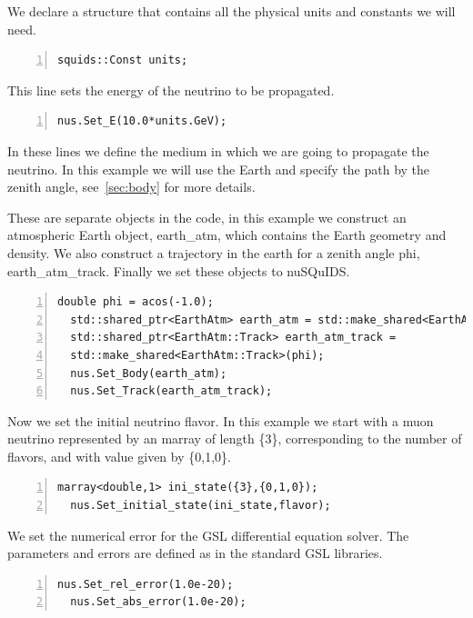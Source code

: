 \documentclass[3p,12pt]{elsarticle}
\newcommand{\ttf}{\ttfamily}
\begin{document}
We declare a structure that contains all the physical units and
constants we will need. 
\begin{lstlisting}[frame=leftline, numbers = left,breaklines=true, label = ex:sin1,firstnumber=last]
  squids::Const units;
\end{lstlisting}

This line sets the energy of the neutrino to be propagated.
\begin{lstlisting}[frame=leftline, numbers = left,breaklines=true, label = ex:sin1,firstnumber=last]
  nus.Set_E(10.0*units.GeV);
\end{lstlisting}

In these lines we define the medium in which we are going to propagate
the neutrino. In this example we will use the Earth and specify the
path by the zenith angle, see~\ref{sec:body} for more details.

These are separate objects in the code, in this example we construct
an atmospheric Earth object, {\ttf earth\_atm}, which contains the
Earth geometry and density. We also construct a trajectory in the
earth for a zenith angle {\ttf phi}, {\ttf earth\_atm\_track}. Finally
we set these objects to nuSQuIDS.

\begin{lstlisting}[frame=leftline, numbers = left,breaklines=true, label = ex:sin1,firstnumber=last]
  double phi = acos(-1.0);
  std::shared_ptr<EarthAtm> earth_atm = std::make_shared<EarthAtm>();
  std::shared_ptr<EarthAtm::Track> earth_atm_track =
  std::make_shared<EarthAtm::Track>(phi);
  nus.Set_Body(earth_atm);
  nus.Set_Track(earth_atm_track);
\end{lstlisting}

Now we set the initial neutrino flavor. In this example we start with
a muon neutrino represented by an {\ttf marray} of length {\ttf
  \{3\}}, corresponding to the number of flavors, and with value given
by {\ttf\{0,1,0\}}.


\begin{lstlisting}[frame=leftline, numbers = left,breaklines=true, label = ex:sin1,firstnumber=last]
  marray<double,1> ini_state({3},{0,1,0});
  nus.Set_initial_state(ini_state,flavor);
\end{lstlisting}

We set the numerical error for the GSL differential equation solver.
The parameters and errors are defined as in the standard GSL libraries.

\begin{lstlisting}[frame=leftline, numbers = left,breaklines=true, label = ex:sin1,firstnumber=last]
  nus.Set_rel_error(1.0e-20);
  nus.Set_abs_error(1.0e-20);
\end{lstlisting}
\end{document}
